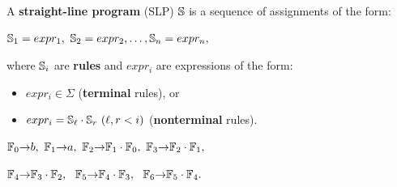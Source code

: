 \documentclass{beamer}
\begin{document}
\begin{frame}
\frametitle{}

\begin{definition}
    A \textbf{straight-line program} (SLP) $\mathbb{S}$ is a sequence of assignments of the form:
    
    \begin{center}
        $\mathbb{S}_1 = expr_1,\ \mathbb{S}_2 = expr_2, \dots, \mathbb{S}_n = expr_n,$
    \end{center}
    where $\mathbb{S}_i$ are \textbf{rules} and $expr_i$ are expressions of the form:
    \begin{itemize}
        \item $expr_i \in \Sigma$ (\textbf{terminal} rules), or
        \item $expr_i = \slp{S}_\ell\cdot \slp{S}_r \ (\ell, r < i)$
        (\textbf{nonterminal} rules).
    \end{itemize}
\end{definition}

\pause

\begin{example}
    \begin{center}
    $\slp{F}_0{\to} b,\ \slp{F}_1{\to} a,\ \slp{F}_2{\to} \slp{F}_1\cdot\slp{F}_0,\ \slp{F}_3{\to} \slp{F}_2\cdot\slp{F}_1,$ 
    
    $\slp{F}_4{\to} \slp{F}_3\cdot\slp{F}_2,\ \ \slp{F}_5{\to} \slp{F}_4\cdot\slp{F}_3,\ \ \slp{F}_6{\to} \slp{F}_5\cdot\slp{F}_4.$
    \end{center}
\end{example}

\end{frame}

\begin{frame}
\frametitle{}

\begin{example}
    \begin{center}
        \FibonacciWordSLP
    \end{center}
\end{example}

\end{frame}
\end{document}
